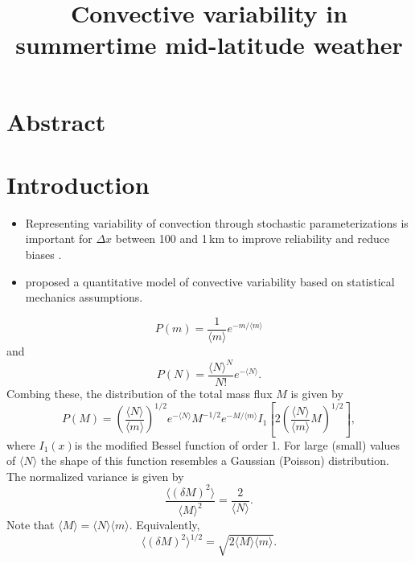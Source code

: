 \documentclass[a4paper, 12pt]{article}
\title{Convective variability in summertime mid-latitude weather}
\begin{document}
% 

\section*{Abstract}


\section{Introduction}
\begin{itemize}
 \item Representing variability of convection through stochastic parameterizations is important for $\Delta x$ between 100 and 1\,km to improve reliability and reduce biases \citep{Jones2011, Berner2016}.
 \item \cite{Craig2006} proposed a quantitative model of convective variability based on statistical mechanics assumptions. 
\end{itemize}
\begin{equation} \label{eq:m_dist}
 P(m) = \frac{1}{\langle m \rangle}e^{-m/\langle m \rangle}
\end{equation}
and 
\begin{equation} \label{eq:N_dist}
 P(N) = \frac{\langle N \rangle^N}{N!}e^{-\langle N \rangle}.
\end{equation}
Combing these, the distribution of the total mass flux $M$ is given by
\begin{equation} \label{eq:M_dist}
 P(M) = \left( \frac{\langle N \rangle}{\langle m \rangle} \right)^{1/2} e^{-\langle N \rangle} M^{-1/2} e^{-M/\langle m \rangle} I_1\left[ 2 \left( \frac{\langle N \rangle}{\langle m \rangle} M \right)^{1/2} \right],
\end{equation}
where $I_1(x)$is the modified Bessel function of order 1. For large (small) values of $\langle N \rangle$ the shape of this function resembles a Gaussian (Poisson) distribution. The normalized variance is given by 
\begin{equation} \label{eq:M_var}
 \frac{\langle (\delta M)^2 \rangle}{\langle M \rangle^2} = \frac{2}{\langle N \rangle}.
\end{equation}
Note that $\langle M \rangle = \langle N \rangle \langle m \rangle$. Equivalently,
\begin{equation} \label{eq:M_std}
 \langle (\delta M)^2 \rangle^{1/2}= \sqrt{2 \langle M \rangle \langle m \rangle}.
\end{equation}
\end{document}
